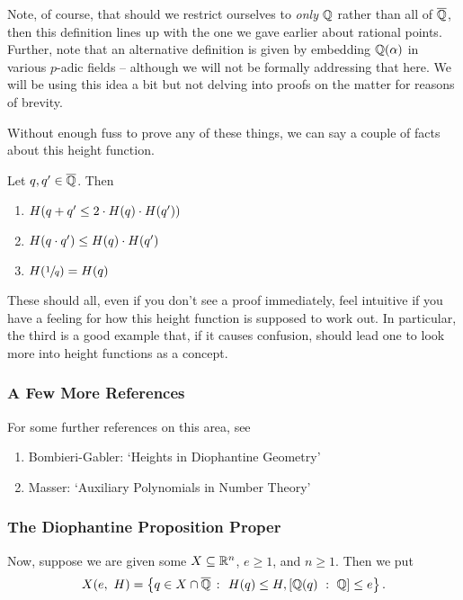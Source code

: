 \begin{remark}
  Note, of course, that should we restrict ourselves to \emph{only} $\Q$ rather than all of $\Qbar$, then this definition lines up with the one we gave earlier about rational points. Further, note that an alternative definition is given by embedding $\Q(\alpha)$ in various $p$-adic fields -- although we will not be formally addressing that here. We will be using this idea a bit but not delving into proofs on the matter for reasons of brevity.
\end{remark}

Without enough fuss to prove any of these things, we can say a couple of facts about this height function.

\begin{proposition}
  Let $q, \pri{q} \in \Qbar$. Then
    \begin{enumerate}
      \item $H(q + \pri{q} \leq 2 \cdot H(q) \cdot H(\pri{q}))$
      \item $H(q \cdot \pri{q}) \leq H(q) \cdot H(\pri{q})$
      \item $H(\sfrac{1}{q}) = H(q)$
    \end{enumerate}
    These should all, even if you don't see a proof immediately, feel intuitive if you have a feeling for how this height function is supposed to work out. In particular, the third is a good example that, if it causes confusion, should lead one to look more into height functions as a concept.
\end{proposition}

\subsubsection{A Few More References}

For some further references on this area, see
\begin{enumerate}
  \item Bombieri-Gabler: `Heights in Diophantine Geometry'
  \item Masser: `Auxiliary Polynomials in Number Theory'
\end{enumerate}

\subsubsection{The Diophantine Proposition Proper}

Now, suppose we are given some $\XRn[X]{n}$, $e \geq 1$, and $n \geq 1$. Then we put
  \begin{align*}
    \XeH{e} = \left\{ q \in X \cap \Qbar \ \colon \ H(q) \leq H, [\Q(q) \ : \ \Q] \leq e \right\}.
  \end{align*}

